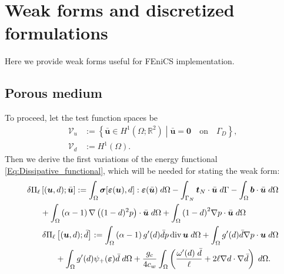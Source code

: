 \section{Weak forms {and discretized formulations}}\label{sub:weak_form}
Here we provide weak forms useful for FEniCS implementation. 

\subsection{Porous medium} \label{sub:weak_porous}
To proceed, let the test function spaces be
\begin{equation*}
    \begin{aligned}
        \mathscr{V}_u &:= \left\{\bar{\bm{u}}\in H^1\left(\Omega; \mathbb{R}^2\right) \middle|
        \bar{\bm{u}} = \mathbf{0} \quad \text{on} \quad\Gamma_D
        \right\},\\
        \mathscr{V}_d &:= H^1(\Omega).
    \end{aligned}
\end{equation*}
Then we derive the first variations of the energy functional \eqref{Eq:Dissipative_functional}, which will be needed for stating the weak form:
\begin{subequations} \label{Eq:Residual}
    \begin{align}
	    \begin{split}
	    \label{Eq:Residual_u}\delta \Pi_\ell & \left[(\bm{u}, d); \bar{\bm{u}} \right]
	    := \int_\Omega \bm{\sigma}[\bm{\varepsilon}(\bm{u}), d] : \bm{\varepsilon}(\bar{\bm{u}}) \;d\Omega - \int_{\Gamma_N} \bm{t}_N\cdot \bar{\bm{u}} \; d\Gamma - \int_\Omega \bm{b} \cdot\bar{\bm{u}}\; d\Omega \\
	    &+\int_{\Omega} \left(\alpha-1\right) \nabla \left((1-d)^2  {p}\right) \cdot \bar{\bm{u}} \; d\Omega + \int_{\Omega}  {\left(1 - d\right)}^2\nabla {p}\cdot \bar{\bm{u}}  \; d\Omega
	    \end{split}\\
	    \begin{split}
	     \label{Eq:Residual_d}\delta \Pi_\ell & \left[(\bm{u}, d);  \bar{d} \right]
	    	    := \int_{\Omega} \left(\alpha-1\right)g'(d)\bar{d} {p} \operatorname{div}{\bm{u}} \; d\Omega +	\int_{\Omega} g'(d)\bar{d}   \nabla {p} \cdot {\bm{u}} \; d\Omega 
        \\
	    & + \int_\Omega g'(d) \psi_+(\bm{\varepsilon}) \bar{d}  \; d\Omega +
	    \frac{g_c}{4c_w} \int_\Omega  \left(\frac{\omega'(d)\;\bar{d}}{\ell} + 2\ell \nabla d\cdot\nabla \bar{d} \right)\;d\Omega.
	    \end{split}
	\end{align}
\end{subequations}
